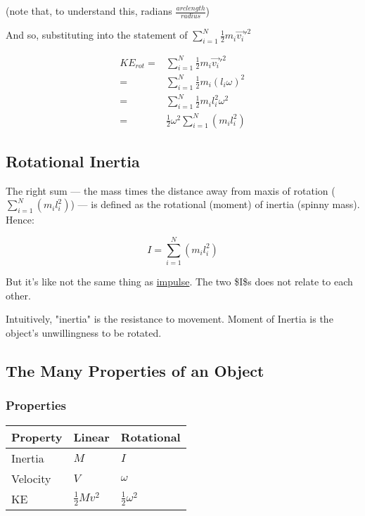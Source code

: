 \documentclass[letterpaper]{article}
\begin{document}
(note that, to understand this, radians \(\frac{arc length}{radius}\))

And so, substituting into the statement of \(\sum^N_{i=1} \frac{1}{2}m_i\vec{v_i}'^2\)

\begin{align}
    KE_{rot} =& \sum^N_{i=1} \frac{1}{2}m_i\vec{v_i}'^2 \\
    =& \sum^N_{i=1} \frac{1}{2}m_i(l_i \omega)^2 \\
    =& \sum^N_{i=1} \frac{1}{2}m_i l_i^2 \omega^2 \\
    =& \frac{1}{2}\omega^2 \sum^N_{i=1} (m_i l_i^2)
\end{align}

\subsection{Rotational Inertia}
\label{sec:org62b71d0}
The right sum --- the mass times the distance away from maxis of rotation (\(\sum^N_{i=1} (m_i l_i^2)\)) --- is defined as the rotational (moment) of inertia (spinny mass). Hence:

\begin{equation}
    I = \sum^N_{i=1} (m_i l_i^2)
\end{equation}

But it's like not the same thing as \href{KBhPHYS360Impulse.org}{impulse}. The two \$I\$s does not relate to each other.

Intuitively, "inertia" is the resistance to movement. Moment of Inertia is the object's unwillingness to be rotated.

\subsection{The Many Properties of an Object}
\label{sec:org223e476}

\subsubsection{Properties}
\label{sec:orge95e676}
\begin{center}
\begin{tabular}{lll}
Property & Linear & Rotational\\
\hline
Inertia & \(M\) & \(I\)\\
Velocity & \(V\) & \(\omega\)\\
KE & \(\frac{1}{2}Mv^2\) & \(\frac{1}{2}\omega^2\)\\
\end{tabular}
\end{center}
\end{document}
